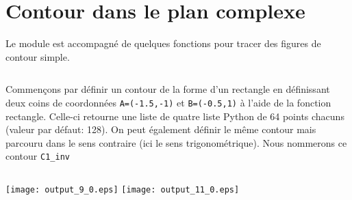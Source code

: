 \section{Contour dans le plan complexe\label{contour-dans-le-plan-complexe}}
Le module est accompagné de quelques fonctions pour tracer des figures
de contour simple.
\begin{tcolorbox}[breakable, size=fbox, boxrule=1pt, 
    pad at break*=1mm,colback=cellbackground, colframe=cellborder]
\inputminted{python}{codes/python/annexe_cauchy_cellule4.py}
\end{tcolorbox}

Commençons par définir un contour de la forme d'un rectangle en
définissant deux coins de coordonnées \texttt{A=(-1.5,-1)} et
\texttt{B=(-0.5,1)} à l'aide de la fonction rectangle. Celle-ci retourne
une liste de quatre liste Python de 64 points chacuns (valeur par
défaut: 128).
On peut également définir le même contour mais parcouru dans le sens
contraire (ici le sens trigonométrique). Nous nommerons ce contour
\texttt{C1\_inv}

\begin{tcolorbox}[breakable, size=fbox, boxrule=1pt, 
    pad at break*=1mm,colback=cellbackground, colframe=cellborder]
\inputminted{python}{codes/python/annexe_cauchy_cellule5.py}
\end{tcolorbox}
\begin{center}
    \texttt{[image: output\_9\_0.eps]}
    \texttt{[image: output\_11\_0.eps]}
\end{center}

